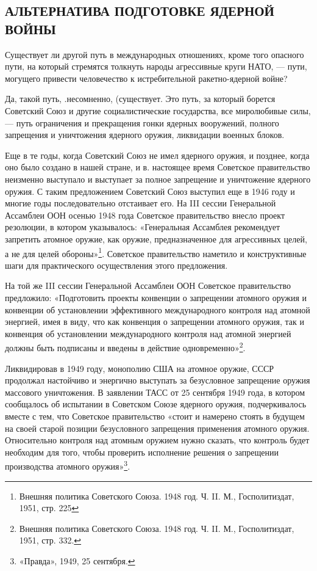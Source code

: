 \documentclass[12pt, a4paper, openany]{book}
\begin{document}
	\subsection[Альтернатива подготовке ядерной войны]{\center АЛЬТЕРНАТИВА ПОДГОТОВКЕ ЯДЕРНОЙ ВОЙНЫ}	
		
	Существует ли другой путь в международных отношениях, кроме того опасного пути, на который стремятся толкнуть народы агрессивные круги НАТО, — пути, могущего привести человечество к истребительной ракетно-ядерной войне?
	
	Да, такой путь, .несомненно, (существует. Это путь, за который борется Советский Союз и другие социалистические государства, все миролюбивые силы, — путь ограничения и прекращения гонки ядерных вооружений, полного запрещения и уничтожения ядерного оружия, ликвидации военных блоков.
	
	Еще в те годы, когда Советский Союз не имел ядерного оружия, и позднее, когда оно было создано в нашей стране, и в. настоящее время Советское правительство неизменно выступало и выступает за полное запрещение и уничтожение ядерного оружия. С таким предложением Советский Союз выступил еще в 1946 году и многие годы последовательно отстаивает его. На III сессии Генеральной Ассамблеи ООН осенью 1948 года Советское правительство внесло проект резолюции, в котором указывалось: «Генеральная Ассамблея рекомендует запретить атомное оружие, как оружие, предназначенное для агрессивных целей, а не для целей обороны»{\footnote{Внешняя политика Советского Союза. 1948 год. Ч. II. М., Госполитиздат, 1951, стр. 225}}. Советское правительство наметило и конструктивные шаги для практического осуществления этого предложения.
	
	На той же III сессии Генеральной Ассамблеи ООН Советское правительство предложило: «Подготовить проекты конвенции о запрещении атомного оружия и конвенции об установлении эффективного международного контроля над атомной энергией, имея в виду, что как конвенция о запрещении атомного оружия, так и конвенция об установлении международного контроля над атомной энергией должны быть подписаны и введены в действие одновременно»{\footnote{Внешняя политика Советского Союза. 1948 год. Ч. II. М., Госполитиздат, 1951, стр. 332.}}.
	
	Ликвидировав в 1949 году, монополию США на атомное оружие, СССР продолжал настойчиво и энергично выступать за безусловное запрещение оружия массового уничтожения. В заявлении ТАСС от 25 сентября 1949 года, в котором сообщалось об испытании в Советском Союзе ядерного оружия, подчеркивалось вместе с тем, что Советское правительство «стоит и намерено стоять в будущем на своей старой позиции безусловного запрещения применения атомного оружия.
	Относительно контроля над атомным оружием нужно сказать, что контроль будет необходим для того, чтобы проверить исполнение решения о запрещении производства атомного оружия»{\footnote{«Правда», 1949, 25 сентября.}}.
	
\end{document}
